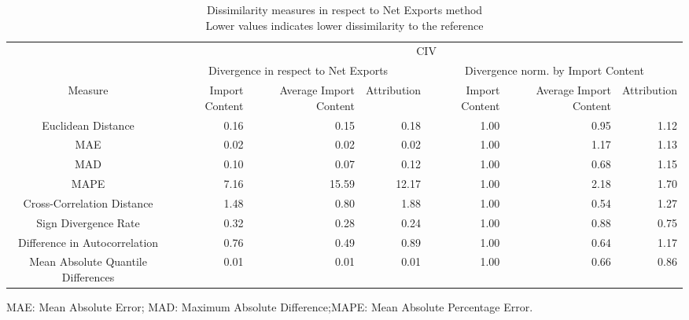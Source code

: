 \begin{table}[t]
\caption*{
{\large Dissimilarity measures in respect to Net Exports method} \\ 
{\small Lower values indicates lower dissimilarity to the reference}
} 
\fontsize{15.0pt}{18.0pt}\selectfont
\begin{tabular*}{\linewidth}{@{\extracolsep{\fill}}crrrrrr}
\toprule
 & \multicolumn{6}{c}{CIV} \\ 
\cmidrule(lr){2-7}
 & \multicolumn{3}{c}{Divergence in respect to Net Exports} & \multicolumn{3}{c}{Divergence norm. by Import Content} \\ 
\cmidrule(lr){2-4} \cmidrule(lr){5-7}
Measure & Import Content & Average Import Content & Attribution & Import Content & Average Import Content & Attribution \\ 
\midrule\addlinespace[2.5pt]
Euclidean Distance & 0.16 & 0.15 & 0.18 & 1.00 & 0.95 & 1.12 \\ 
MAE & 0.02 & 0.02 & 0.02 & 1.00 & 1.17 & 1.13 \\ 
MAD & 0.10 & 0.07 & 0.12 & 1.00 & 0.68 & 1.15 \\ 
MAPE & 7.16 & 15.59 & 12.17 & 1.00 & 2.18 & 1.70 \\ 
Cross-Correlation Distance & 1.48 & 0.80 & 1.88 & 1.00 & 0.54 & 1.27 \\ 
Sign Divergence Rate & 0.32 & 0.28 & 0.24 & 1.00 & 0.88 & 0.75 \\ 
Difference in Autocorrelation & 0.76 & 0.49 & 0.89 & 1.00 & 0.64 & 1.17 \\ 
Mean Absolute Quantile Differences & 0.01 & 0.01 & 0.01 & 1.00 & 0.66 & 0.86 \\ 
\bottomrule
\end{tabular*}
\begin{minipage}{\linewidth}
MAE: Mean Absolute Error; MAD: Maximum Absolute Difference;MAPE: Mean Absolute Percentage Error.\\
\end{minipage}
\end{table}

